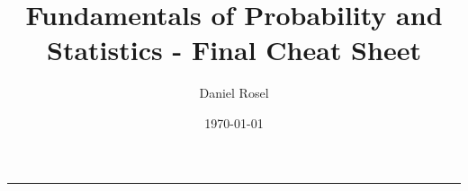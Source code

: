 \documentclass[11pt]{article}
\author{Daniel Rosel}
\date{\today}
\title{Fundamentals of Probability and Statistics - Final Cheat Sheet}
\def\maketitle{}
\def\cheatsheeturl{}
\begin{document}
\maketitle



\fontsize{9}{10}\selectfont

\theauthor \hfill {\tiny \mbox{\url{\cheatsheeturl}}} \hfill \thedate
\hrule

\vspace{1em}
{\center \large\bf \thetitle \\ }



%
%
%
\makeatletter
\renewcommand\section[1]{
  \@startsection {section}{1}{0ex}%
                 {1em}%
                 {-1em}%
         { \color{black}\normalfont\bfseries}* {\fbox{#1} \vspace{2ex}\newline }}
\makeatother


\makeatletter
\renewcommand\subsection[1]{ \room \hrule \vspace{-0.3em} }
\makeatother

\def\labelitemi{$\diamond$}
\def\labelitemii{$\circ$}
\def\labelitemiii{$\star$}

%


\renewenvironment{parallel}[1][2] %
 {
  \setlength{\columnseprule}{2pt}
  \begin{minipage}[t]{\linewidth} %
  \begin{multicols}{#1}  %
 }
 {
  \end{multicols}
  \end{minipage}
 }
\end{document}
